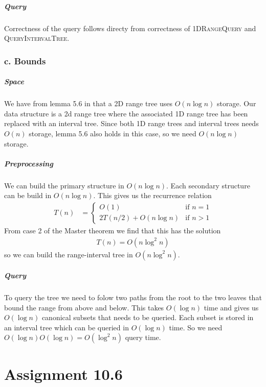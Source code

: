 \documentclass[10pt,a4paper,final,oneside,openany,article]{memoir}
\newcommand{\twopartdef}[4] {
  \left\{
    \begin{array}{ll}
      #1 & \mbox{if } #2 \\
      {#3} & \mbox{if } #4
    \end{array}
  \right.
}
\begin{document}
\paragraph{Query}
Correctness of the query follows directy from correctness of \textsc{ 1DRangeQuery} and \textsc{ QueryIntervalTree}.


\subsection*{c. Bounds}
\paragraph{Space}We have from lemma 5.6 in \cite{deBerg} that a 2D range tree uses $O(n \log n)$ storage. Our data structure is a 2d range tree where the associated 1D range tree has been replaced with an interval tree. Since both 1D range trees and interval trees needs $O(n)$ storage, lemma 5.6 also holds in this case, so we need $O(n \log n)$ storage.

\paragraph{Preprocessing}
We can build the primary structure in $O(n \log n)$. Each secondary structure can be build in $O(n \log n)$. This gives us the recurrence relation
\begin{align*}
  T(n) &= \twopartdef{O(1)}{n = 1}{2T(n/2) + O(n \log n)}{n > 1}
\end{align*}
From case 2 of the Master theorem we find that this has the solution
\begin{align*}
  T(n) = O(n \log^2 n)
\end{align*}
so we can build the range-interval tree in $O(n \log^2 n)$.

\paragraph{Query}
To query the tree we need to folow two paths from the root to the two leaves that bound the range from above and below. This takes $O(\log n)$ time and gives us $O(\log n)$ canonical subsets that needs to be queried. Each subset is stored in an interval tree which can be queried in $O(\log n)$ time. So we need $O(\log n)O(\log n) = O(\log^2 n)$ query time.




\chapter*{Assignment 10.6}
\end{document}
